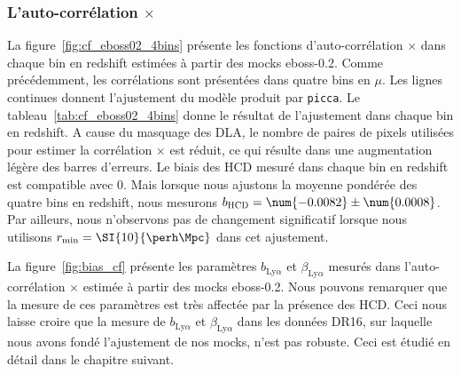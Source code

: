 \subsubsection{L'auto-corrélation \lya{}$\times$\lya{}}
La figure~\ref{fig:cf_eboss02_4bins} présente les fonctions d'auto-corrélation \lya{}$\times$\lya{} dans chaque bin en redshift estimées à partir des mocks eboss-0.2. Comme précédemment, les corrélations sont présentées dans quatre bins en $\mu$.
Les lignes continues donnent l'ajustement du modèle produit par \texttt{picca}.
Le tableau~\ref{tab:cf_eboss02_4bins} donne le résultat de l'ajustement dans chaque bin en redshift.
A cause du masquage des DLA, le nombre de paires de pixels utilisées pour estimer la corrélation \lya{}$\times$\lya{} est réduit, ce qui résulte dans une augmentation légère des barres d'erreurs.
Le biais des HCD mesuré dans chaque bin en redshift est compatible avec 0.
Mais lorsque nous ajustons la moyenne pondérée des quatre bins en redshift, nous mesurons $b_{\textsc{HCD}} = \num{-0.0082} \pm \num{0.0008}$. 
Par ailleurs, nous n'observons pas de changement significatif lorsque nous utilisons $r_{\mathrm{min}} = \SI{10}{\perh\Mpc}$ dans cet ajustement.

La figure~\ref{fig:bias_cf} présente les paramètres  $b_{\mathrm{Ly}\alpha}$ et $\beta_{\mathrm{Ly}\alpha}$ mesurés dans l'auto-corrélation \lya{}$\times$\lya{} estimée à partir des mocks eboss-0.2. Nous pouvons remarquer que la mesure de ces paramètres est très affectée par la présence des HCD. Ceci nous laisse croire que la mesure de $b_{\mathrm{Ly}\alpha}$ et $\beta_{\mathrm{Ly}\alpha}$ dans les données DR16, sur laquelle nous avons fondé l'ajustement de nos mocks, n'est pas robuste. Ceci est étudié en détail dans le chapitre suivant.


